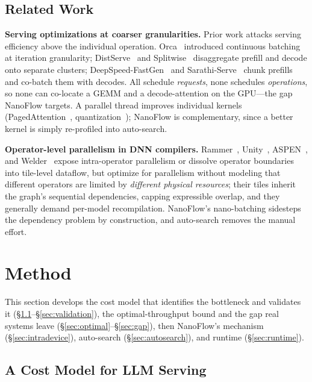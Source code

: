 \documentclass[manuscript,review]{acmart}
\newcommand{\nf}{NanoFlow\xspace}   %
\begin{document}
\subsection{Related Work}
\label{sec:related}

\textbf{Serving optimizations at coarser granularities.} Prior work attacks serving efficiency 
above the individual operation. Orca~\cite{yu2022orca} introduced continuous batching at iteration 
granularity; DistServe~\cite{zhong2024distserve} and Splitwise~\cite{patel2023splitwise} disaggregate prefill 
and decode onto separate clusters; DeepSpeed-FastGen~\cite{holmes2024deepspeed} and 
Sarathi-Serve~\cite{agrawal2024sarathi} chunk prefills and co-batch them with decodes. All schedule 
\emph{requests}, none schedules \emph{operations}, so none can co-locate a GEMM and a decode-attention on the 
GPU---the gap \nf targets. A parallel thread improves individual kernels 
(PagedAttention~\cite{kwon2023efficient}, quantization~\cite{lin2024qserve, tang2024quest, zhao2023atom}); 
\nf is complementary, since a better kernel is simply re-profiled into auto-search.

\textbf{Operator-level parallelism in DNN compilers.} Rammer~\cite{ma2020rammer}, Unity~\cite{unger2022unity}, 
ASPEN~\cite{park2023aspen}, and Welder~\cite{shi2023welder} expose intra-operator parallelism or dissolve 
operator boundaries into tile-level dataflow, but optimize for parallelism without modeling that different 
operators are limited by \emph{different physical resources}; their tiles inherit the graph's sequential 
dependencies, capping expressible overlap, and they generally demand per-model recompilation. 
\nf's nano-batching sidesteps the dependency problem by construction, and auto-search removes the manual effort.

\section{Method}
\label{sec:method}

This section develops the cost model that identifies the bottleneck and validates it
(\S\ref{sec:costmodel}--\S\ref{sec:validation}), the optimal-throughput bound and the gap real systems 
leave (\S\ref{sec:optimal}--\S\ref{sec:gap}), then \nf's mechanism (\S\ref{sec:intradevice}), auto-search 
(\S\ref{sec:autosearch}), and runtime (\S\ref{sec:runtime}).

\subsection{A Cost Model for LLM Serving}
\label{sec:costmodel}
\end{document}
